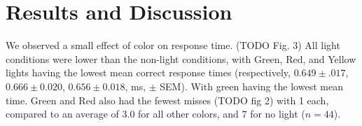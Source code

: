 \section{Results and Discussion}

We observed a small effect of color on response time. (TODO Fig. 3) All light
conditions were lower than the non-light conditions, with Green, Red, and
Yellow lights having the lowest mean correct response times (respectively,
$0.649 \pm .017$, $0.666 \pm 0.020$, $0.656 \pm 0.018$,
ms, $\pm$ SEM). With green having the lowest mean time. Green and Red
also had the fewest misses (TODO fig 2) with 1 each, compared to an average of
$3.0$ for all other colors, and $7$ for no light ($n=44$).



